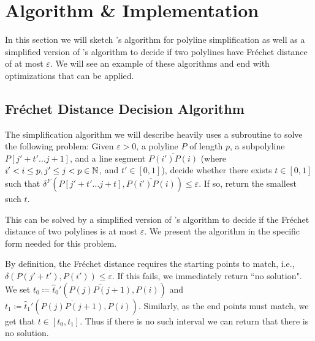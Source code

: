 \section{Algorithm \& Implementation}
\label{sec:algorithm_implementation}

In this section we will sketch \citeauthor{on_optimal_polyline_simplification_using_the_hausdorff_and_frechet_distance}'s algorithm for polyline simplification as well as a simplified version of \citeauthor{computing_the_frechet_distance_between_two_polygonal_curves}'s algorithm to decide if two polylines have Fréchet distance of at most \(\varepsilon\). We will see an example of these algorithms and end with optimizations that can be applied.

\subsection{Fréchet Distance Decision Algorithm}
\label{ssec:alt_godau}
The simplification algorithm we will describe heavily uses a subroutine to solve the following problem: Given \(\varepsilon > 0\), a polyline \(P\) of length \(p\), a subpolyline \(P[j' + t' \dots j+1]\), and a line segment \(\overline{P(i')P(i)}\) (where \(i' < i \leq p, j' \leq j < p\in \mathbb{N}\), and \(t' \in [0, 1]\)), decide whether there exists \(t \in [0, 1]\) such that \(\delta^F(P[j' + t' \dots j + t], \overline{P(i')P(i)}) \leq \varepsilon\). If so, return the smallest such \(t\).  

This can be solved by a simplified version of \citeauthor{computing_the_frechet_distance_between_two_polygonal_curves}'s algorithm to decide if the Fréchet distance of two polylines is at most \(\varepsilon\). We present the algorithm in the specific form needed for this problem. 

By definition, the Fréchet distance requires the starting points to match, i.e., \(\delta(P(j' + t'), P(i')) \leq \varepsilon\). If this fails, we immediately return ``no solution". We set \(t_0 \coloneq \hat t_0'(\overline{P(j)P(j+1)}, P(i))\) and \(t_1 \coloneq \hat t_1'(\overline{P(j)P(j+1)}, P(i))\). Similarly, as the end points must match, we get that \(t \in [t_0, t_1]\). Thus if there is no such interval we can return that there is no solution.

